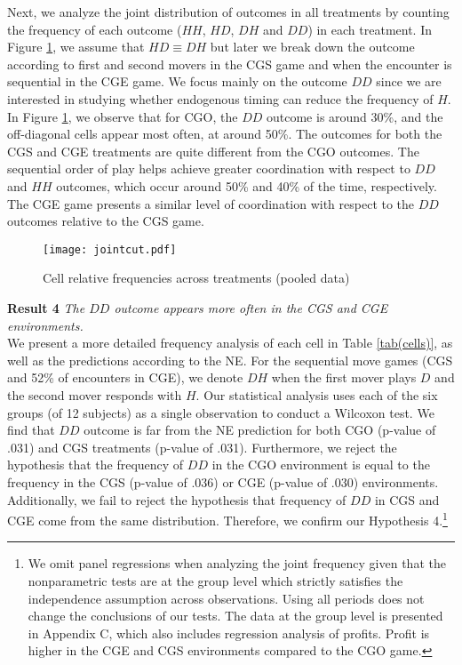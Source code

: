 \documentclass[12pt, letterpaper]{article}
\theoremstyle{plain}
\begin{document}
Next, we analyze the joint distribution of outcomes in all treatments by counting the frequency of each outcome ($HH$, $HD$, $DH$ and $DD$) in each treatment. In Figure \ref{fig:cutpooled}, we assume that $HD\equiv DH$ but later we break down the outcome according to first and second movers in the CGS game and when the encounter is sequential in the CGE game. We focus mainly on the outcome $DD$ since we are interested in studying whether endogenous timing can reduce the frequency of $H$. In Figure \ref{fig:cutpooled}, we observe that for CGO, the $DD$ outcome is around 30\%, and the off-diagonal cells appear most often, at around 50\%. The outcomes for both the CGS and CGE treatments are quite different from the CGO outcomes. The sequential order of play helps achieve greater coordination with respect to $DD$ and $HH$ outcomes, which occur around 50\% and 40\% of the time, respectively. The CGE game presents a similar level of coordination with respect to the $DD$ outcomes relative to the CGS game.\\

\begin{center}
\begin{figure}[!ht]
\centering{}%
\texttt{[image: jointcut.pdf]}%
\caption{Cell relative frequencies across treatments (pooled data)} 
\label{fig:cutpooled}
\end{figure}
\end{center}


\noindent \textbf{Result 4}
\textit{The $DD$ outcome appears more often in the CGS and CGE environments.}\\

We present a more detailed frequency analysis of each cell in Table \ref{tab(cells)}, as well as the predictions according to the NE. For the sequential move games (CGS and 52\% of encounters in CGE), we denote $DH$ when the first mover plays $D$ and the second mover responds with $H$. Our statistical analysis uses each of the six groups (of 12 subjects) as a single observation to conduct a Wilcoxon test. We find that $DD$ outcome is far from the NE prediction for both CGO (p-value of .031) and CGS treatments (p-value of .031). Furthermore, we reject the hypothesis that the frequency of $DD$ in the CGO environment is equal to the frequency in the CGS (p-value of .036) or CGE (p-value of .030) environments. Additionally, we fail to reject the hypothesis that frequency of $DD$ in CGS and CGE come from the same distribution. Therefore, we confirm our Hypothesis 4.\footnote{We omit panel regressions when analyzing the joint frequency given that the nonparametric tests are at the group level which strictly satisfies the independence assumption across observations. Using all periods does not change the conclusions of our tests. The data at the group level is presented in Appendix C, which also includes regression analysis of profits. Profit is higher in the CGE and CGS environments compared to the CGO game.}
\end{document}

